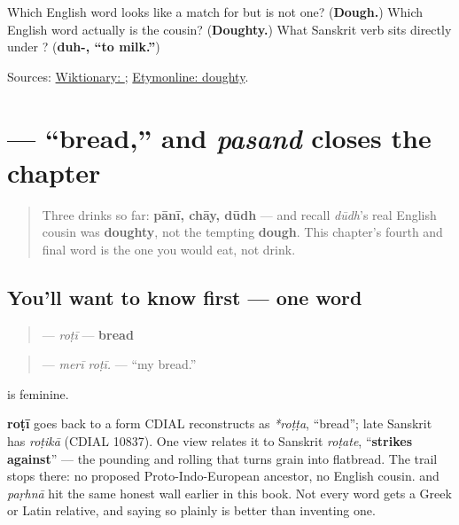 \begin{tcolorbox}[breakable,colback=teal!4,colframe=teal!35!black,title={Before you move on}]
Which English word looks like a match for \textbf{} but is not one? (\textbf{Dough.}) Which English word actually is the cousin? (\textbf{Doughty.}) What Sanskrit verb sits directly under \textbf{}? (\textbf{duh-, \textquotedblleft{}to milk.\textquotedblright{}})

Sources: \href{https://en.wiktionary.org/wiki/\%D8\%AF\%D9\%88\%D8\%AF\%DA\%BE}{Wiktionary: }; \href{https://www.etymonline.com/word/doughty}{Etymonline: doughty}.
\end{tcolorbox}
\section[\texorpdfstring{\ur{روٹی} (roṭī)}{روٹی (roṭī)}]{ — \textquotedblleft{}bread,\textquotedblright{} and \emph{pasand} closes the chapter}

\label{lesson:UR-C12-roti}



\begin{quote}
Three drinks so far: \textbf{pānī, chāy, dūdh} — and recall \emph{dūdh}'s real English cousin was \textbf{doughty}, not the tempting \textbf{dough}. This chapter's fourth and final word is the one you would eat, not drink.
\end{quote}

\subsection*{You'll want to know first — one word}
\begin{quote}
\textbf{} — \emph{roṭī} — \textbf{bread}
\end{quote}

\begin{quote}
\textbf{ } — \emph{merī roṭī.} — \textquotedblleft{}my bread.\textquotedblright{}
\end{quote}

\textbf{} is feminine.

\begin{cousinweb}
\textbf{roṭī} goes back to a form CDIAL reconstructs as \emph{*roṭṭa}, \textquotedblleft{}bread\textquotedblright{}; late Sanskrit has \emph{roṭikā} (CDIAL 10837). One view relates it to Sanskrit \emph{roṭate}, \textquotedblleft{}\textbf{strikes against}\textquotedblright{} — the pounding and rolling that turns grain into flatbread. The trail stops there: no proposed Proto-Indo-European ancestor, no English cousin. \textbf{} and \emph{paṛhnā} hit the same honest wall earlier in this book. Not every word gets a Greek or Latin relative, and saying so plainly is better than inventing one.
\end{cousinweb}

